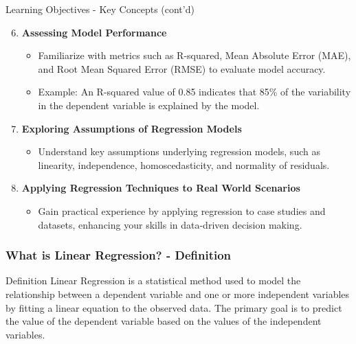 \documentclass[aspectratio=169]{beamer}
\begin{document}
\begin{frame}[fragile]{Learning Objectives - Key Concepts (cont'd)}
    \begin{enumerate}
        \setcounter{enumi}{5} %
        \item \textbf{Assessing Model Performance}
            \begin{itemize}
                \item Familiarize with metrics such as R-squared, Mean Absolute Error (MAE), and Root Mean Squared Error (RMSE) to evaluate model accuracy.
                \item Example: An R-squared value of 0.85 indicates that 85\% of the variability in the dependent variable is explained by the model.
            \end{itemize}
        
        \item \textbf{Exploring Assumptions of Regression Models}
            \begin{itemize}
                \item Understand key assumptions underlying regression models, such as linearity, independence, homoscedasticity, and normality of residuals.
            \end{itemize}
        
        \item \textbf{Applying Regression Techniques to Real World Scenarios}
            \begin{itemize}
                \item Gain practical experience by applying regression to case studies and datasets, enhancing your skills in data-driven decision making.
            \end{itemize}
    \end{enumerate}
\end{frame}

\begin{frame}[fragile]
    \frametitle{What is Linear Regression? - Definition}
    
    \begin{block}{Definition}
        Linear Regression is a statistical method used to model the relationship between a dependent variable and one or more independent variables by fitting a linear equation to the observed data. The primary goal is to predict the value of the dependent variable based on the values of the independent variables.
    \end{block}
    
\end{frame}
\end{document}
